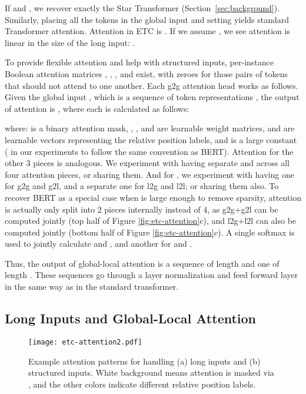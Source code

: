 \documentclass[11pt,a4paper]{article}
\begin{document}
If  and , we recover exactly the Star Transformer (Section~\ref{sec:background}). Similarly, placing all the tokens in the global input and setting  yields standard Transformer attention. Attention in ETC is . If we assume , we see attention is linear in the size of the long input: .

To provide flexible attention and help with structured inputs, per-instance Boolean attention matrices , , , and  exist, with zeroes for those pairs of tokens that should not attend to one another. 
Each g2g attention head works as follows. Given the global input , which is a sequence of token representations , the output of attention is , where each  is calculated as follows:



\noindent where:  is a binary attention mask, , , and  are learnable weight matrices, and  are learnable vectors representing the relative position labels, and  is a large constant ( in our experiments to follow the same convention as BERT). Attention for the other 3 pieces is analogous. We experiment with having separate  and  across all four attention pieces, or sharing them. And for , we experiment with having one for g2g and g2l, and a separate one for l2g and l2l; or sharing them also. To recover BERT as a special case when  is large enough to remove sparsity, attention is actually only split into 2 pieces internally instead of 4, as g2g+g2l can be computed jointly (top half of Figure \ref{fig:etc-attention}c), and l2g+l2l can also be computed jointly (bottom half of Figure \ref{fig:etc-attention}c). A single softmax is used to jointly calculate  and , and another for  and .

Thus, the output of global-local attention is a sequence of length  and one of length . These sequences go through a layer normalization and feed forward layer in the same way as in the standard transformer. 




\subsection{Long Inputs and Global-Local Attention}\label{subsec:longinputs}

\begin{figure}[t!]
	\texttt{[image: etc-attention2.pdf]}
	\centering
	\caption{Example attention patterns for handling (a) long inputs and (b) structured inputs. White background means attention is masked via , and the other colors indicate different relative position labels.}
	\label{fig:etc-attention2}
\end{figure}
\end{document}
